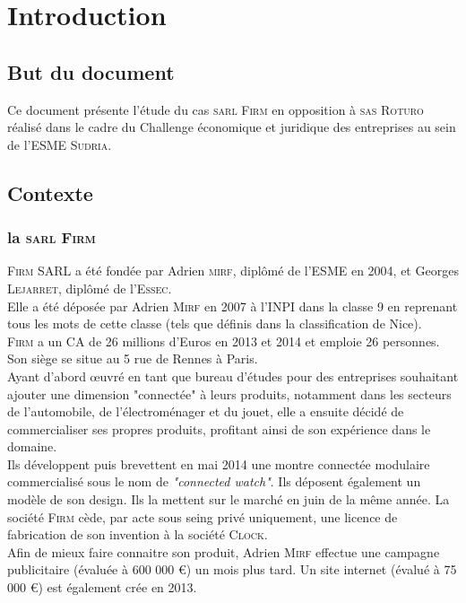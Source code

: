 \chapter*{Introduction}
\thispagestyle{fancy} 
\section{But du document}
Ce document présente l'étude du cas \textsc{sarl Firm} en opposition à \textsc{sas Roturo} réalisé dans le cadre du Challenge économique et juridique des entreprises au sein de l'\textsc{ESME Sudria}. 
\section{Contexte}
\subsection{la \textsc{sarl Firm}}
\textsc{Firm SARL} a été fondée par Adrien \textsc{mirf}, diplômé de l'\textsc{ESME} en 2004, et Georges \textsc{Lejarret}, diplômé de l'\textsc{Essec}. \\
Elle a été déposée par Adrien \textsc{Mirf} en 2007 à l'INPI dans la classe 9 en reprenant tous les mots de cette classe (tels que définis dans la classification de Nice). \\
\textsc{Firm} a un CA de 26 millions d'Euros en 2013 et 2014 et emploie 26 personnes. Son siège se situe au 5 rue de Rennes à Paris. \\ 
Ayant d'abord œuvré en tant que bureau d'études pour des entreprises souhaitant ajouter une dimension "connectée" à leurs produits, notamment dans les secteurs de l'automobile, de l'électroménager et du jouet, elle a ensuite décidé de commercialiser ses propres produits, profitant ainsi de son expérience dans le domaine. \\
Ils développent puis brevettent en mai 2014 une montre connectée modulaire commercialisé sous le nom de \textit{"connected watch"}. Ils déposent également un modèle de son design. Ils la mettent sur le marché en juin de la même année. La société \textsc{Firm} cède, par acte sous seing privé uniquement, une licence de fabrication de son invention à la société \textsc{Clock}. \\
Afin de mieux faire connaitre son produit, Adrien \textsc{Mirf} effectue une campagne publicitaire (évaluée à 600 000 \euro) un mois plus tard. Un site internet (évalué à 75 000 \euro) est également crée en 2013. \\\\
